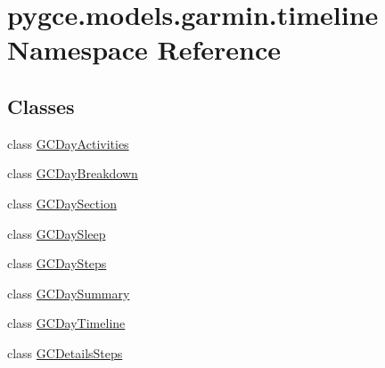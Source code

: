 \hypertarget{namespacepygce_1_1models_1_1garmin_1_1timeline}{}\section{pygce.\+models.\+garmin.\+timeline Namespace Reference}
\label{namespacepygce_1_1models_1_1garmin_1_1timeline}
\subsection*{Classes}
\begin{DoxyCompactItemize}
\item 
class \hyperlink{classpygce_1_1models_1_1garmin_1_1timeline_1_1_g_c_day_activities}{G\+C\+Day\+Activities}
\item 
class \hyperlink{classpygce_1_1models_1_1garmin_1_1timeline_1_1_g_c_day_breakdown}{G\+C\+Day\+Breakdown}
\item 
class \hyperlink{classpygce_1_1models_1_1garmin_1_1timeline_1_1_g_c_day_section}{G\+C\+Day\+Section}
\item 
class \hyperlink{classpygce_1_1models_1_1garmin_1_1timeline_1_1_g_c_day_sleep}{G\+C\+Day\+Sleep}
\item 
class \hyperlink{classpygce_1_1models_1_1garmin_1_1timeline_1_1_g_c_day_steps}{G\+C\+Day\+Steps}
\item 
class \hyperlink{classpygce_1_1models_1_1garmin_1_1timeline_1_1_g_c_day_summary}{G\+C\+Day\+Summary}
\item 
class \hyperlink{classpygce_1_1models_1_1garmin_1_1timeline_1_1_g_c_day_timeline}{G\+C\+Day\+Timeline}
\item 
class \hyperlink{classpygce_1_1models_1_1garmin_1_1timeline_1_1_g_c_details_steps}{G\+C\+Details\+Steps}
\end{DoxyCompactItemize}
